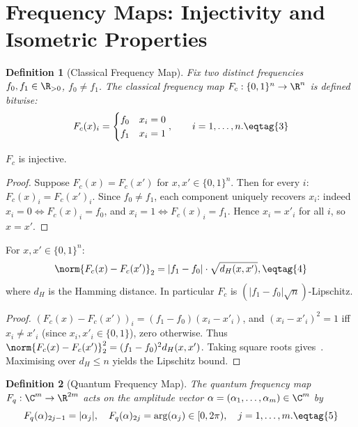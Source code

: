 \documentclass[11pt,letterpaper]{article}
\newtheorem{definition}{Definition}[section]
\begin{document}
\section{Frequency Maps: Injectivity and Isometric Properties}
\label{sec:Fc_Fq}

\begin{definition}[Classical Frequency Map]\label{def:Fc}
Fix two distinct frequencies $f_0, f_1 \in \R_{>0}$, $f_0 \neq f_1$.
The classical frequency map $F_c : \{0,1\}^n \to \R^n$ is defined bitwise:
\[
  F_c(x)_i = \begin{cases} f_0 & x_i = 0 \\ f_1 & x_i = 1 \end{cases}, \qquad i=1,\ldots,n. \eqtag{3}
\]
\end{definition}

\begin{lemma}[Injectivity of $F_c$]\label{lem:Fc-injective}
$F_c$ is injective.
\end{lemma}

\begin{proof}
Suppose $F_c(x) = F_c(x')$ for $x,x'\in\{0,1\}^n$.
Then for every $i$: $F_c(x)_i = F_c(x')_i$.
Since $f_0 \neq f_1$, each component uniquely recovers $x_i$: indeed
$x_i = 0 \iff F_c(x)_i = f_0$, and $x_i = 1 \iff F_c(x)_i = f_1$.
Hence $x_i = x'_i$ for all $i$, so $x = x'$.
\end{proof}

\begin{lemma}\label{lem:Fc-lipschitz}
For $x,x'\in\{0,1\}^n$:
\[
  \norm{F_c(x)-F_c(x')}_2 = |f_1-f_0|\cdot\sqrt{d_H(x,x')}, \eqtag{4}
\]
where $d_H$ is the Hamming distance.
In particular $F_c$ is $(|f_1-f_0|\sqrt{n})$-Lipschitz.
\end{lemma}

\begin{proof}
$(F_c(x)-F_c(x'))_i = (f_1-f_0)(x_i - x'_i)$,
and $(x_i-x'_i)^2 = 1$ iff $x_i \neq x'_i$ (since $x_i, x'_i \in\{0,1\}$),
zero otherwise.
Thus $\norm{F_c(x)-F_c(x')}_2^2 = (f_1-f_0)^2 d_H(x,x')$.
Taking square roots gives~. Maximising over $d_H \leq n$ yields
the Lipschitz bound.
\end{proof}

\begin{definition}[Quantum Frequency Map]\label{def:Fq}
The quantum frequency map $F_q : \C^m \to \R^{2m}$ acts on the amplitude
vector $\alpha = (\alpha_1,\ldots,\alpha_m) \in \C^m$ by
\[
  F_q(\alpha)_{2j-1} = |\alpha_j|, \quad
  F_q(\alpha)_{2j} = \arg(\alpha_j) \in [0, 2\pi), \quad j=1,\ldots,m. \eqtag{5}
\]
\end{definition}
\end{document}
